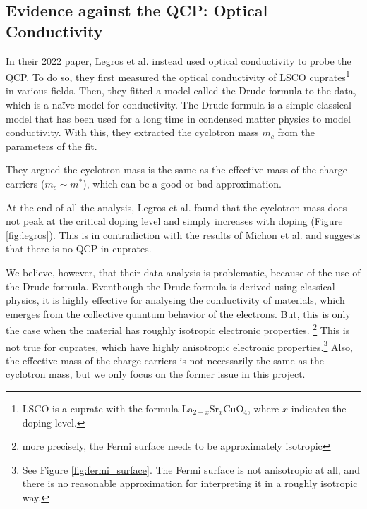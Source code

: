 \subsection{Evidence against the QCP: Optical Conductivity}
In their 2022 paper, Legros et al.\cite{legros2022} instead used optical conductivity to
probe the QCP. To do so, they first measured the optical conductivity of LSCO cuprates\footnote{
LSCO is a cuprate with the formula La$_{2-x}$Sr$_x$CuO$_4$, where $x$ indicates the doping level.}
in various fields. Then, they fitted a model called the Drude formula to the data, which is a naïve
model for conductivity. The Drude formula is a simple classical model that has been used for a long
time in condensed matter physics to model conductivity. With this, they extracted the cyclotron mass
$m_c$ from the parameters of the fit.

They argued the cyclotron mass is the same as the effective mass of the charge carriers
($m_c \sim m^*$), which can be a good or bad approximation.

At the end of all the analysis, Legros et al. found that the cyclotron mass does not peak
at the critical doping level and simply increases with doping (Figure \ref{fig:legros}). This is in contradiction with the
results of Michon et al. and suggests that there is no QCP in cuprates.

We believe, however, that their data analysis is problematic, because of the use of the Drude
formula. Eventhough the Drude formula is derived using classical physics, it is highly effective for
analysing the conductivity of materials, which emerges from the collective quantum behavior of the
electrons. But, this is only the case when the material has roughly isotropic electronic properties.
\footnote{more precisely, the Fermi surface needs to be approximately isotropic} This is not true
for cuprates, which have highly anisotropic electronic properties.\footnote{See Figure
\ref{fig:fermi_surface}. The Fermi surface is not anisotropic at all, and there is no reasonable
approximation for interpreting it in a roughly isotropic way.} Also, the effective mass of the
charge carriers is not necessarily the same as the cyclotron mass, but we only focus on the former
issue in this project.

